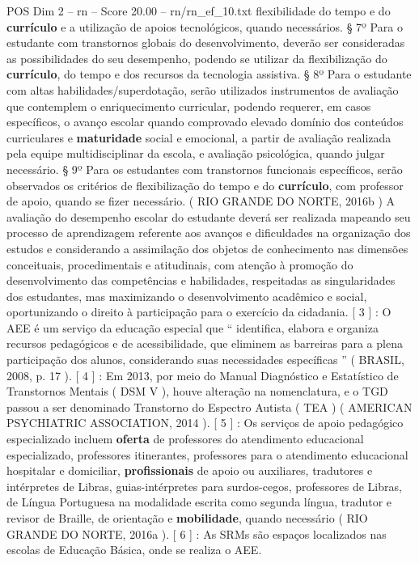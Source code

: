 \begin{textsample}{POS Dim 2 – rn – Score 20.00 – rn/rn\_ef\_10.txt}
flexibilidade do tempo e do \textbf{currículo} e a utilização de apoios tecnológicos, quando necessários. § 7º Para o estudante com transtornos globais do desenvolvimento, deverão ser consideradas as possibilidades do seu desempenho, podendo se utilizar da flexibilização do \textbf{currículo}, do tempo e dos recursos da tecnologia assistiva. § 8º Para o estudante com altas habilidades/superdotação, serão utilizados instrumentos de avaliação que contemplem o enriquecimento curricular, podendo requerer, em casos específicos, o avanço escolar quando comprovado elevado domínio dos conteúdos curriculares e \textbf{maturidade} social e emocional, a partir de avaliação realizada pela equipe multidisciplinar da escola, e avaliação psicológica, quando julgar necessário. § 9º Para os estudantes com transtornos funcionais específicos, serão observados os critérios de flexibilização do tempo e do \textbf{currículo}, com professor de apoio, quando se fizer necessário. ( RIO GRANDE DO NORTE, 2016b ) A avaliação do desempenho escolar do estudante deverá ser realizada mapeando seu processo de aprendizagem referente aos avanços e dificuldades na organização dos estudos e considerando a assimilação dos objetos de conhecimento nas dimensões conceituais, procedimentais e atitudinais, com atenção à promoção do desenvolvimento das competências e habilidades, respeitadas as singularidades dos estudantes, mas maximizando o desenvolvimento acadêmico e social, oportunizando o direito à participação para o exercício da cidadania. [ 3 ] : O AEE é um serviço da educação especial que “ identifica, elabora e organiza recursos pedagógicos e de acessibilidade, que eliminem as barreiras para a plena participação dos alunos, considerando suas necessidades específicas ” ( BRASIL, 2008, p. 17 ). [ 4 ] : Em 2013, por meio do Manual Diagnóstico e Estatístico de Transtornos Mentais ( DSM V ), houve alteração na nomenclatura, e o TGD passou a ser denominado Transtorno do Espectro Autista ( TEA ) ( AMERICAN PSYCHIATRIC ASSOCIATION, 2014 ). [ 5 ] : Os serviços de apoio pedagógico especializado incluem \textbf{oferta} de professores do atendimento educacional especializado, professores itinerantes, professores para o atendimento educacional hospitalar e domiciliar, \textbf{profissionais} de apoio ou auxiliares, tradutores e intérpretes de Libras, guias-intérpretes para surdos-cegos, professores de Libras, de Língua Portuguesa na modalidade escrita como segunda língua, tradutor e revisor de Braille, de orientação e \textbf{mobilidade}, quando necessário ( RIO GRANDE DO NORTE, 2016a ). [ 6 ] : As SRMs são espaços localizados nas escolas de Educação Básica, onde se realiza o AEE.

\end{textsample}
